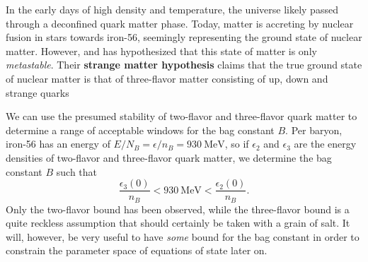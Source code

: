 In the early days of high density and temperature, the universe likely passed through a deconfined quark matter phase.
Today, matter is accreting by nuclear fusion in stars towards iron-56, seemingly representing the ground state of nuclear matter.
However, \cite{ref:strange_hypothesis_bodmer} and \cite{ref:strange_hypothesis_witten} has hypothesized that this state of matter is only \emph{metastable}.
Their \textbf{strange matter hypothesis} claims that the true ground state of nuclear matter is that of three-flavor matter consisting of up, down and strange quarks

We can use the presumed stability of two-flavor and three-flavor quark matter to determine a range of acceptable windows for the bag constant $B$.
Per baryon, iron-56 has an energy of $E/N_B = \epsilon/n_B = \SI{930}{\mega\electronvolt}$,
so if $\epsilon_2$ and $\epsilon_3$ are the energy densities of two-flavor and three-flavor quark matter,
we determine the bag constant $B$ such that
\begin{equation}
	\frac{\epsilon_3(0)}{n_B} < \SI{930}{\mega\electronvolt} < \frac{\epsilon_2(0)}{n_B} .
\label{eq:lsm:bag_stability}
\end{equation}
Only the two-flavor bound has been observed,
while the three-flavor bound is a quite reckless assumption that should certainly be taken with a grain of salt.
It will, however, be very useful to have \emph{some} bound for the bag constant in order to constrain the parameter space of equations of state later on.

\begin{figure}[bh!]
\centering
{}
\caption{}
\end{figure}




